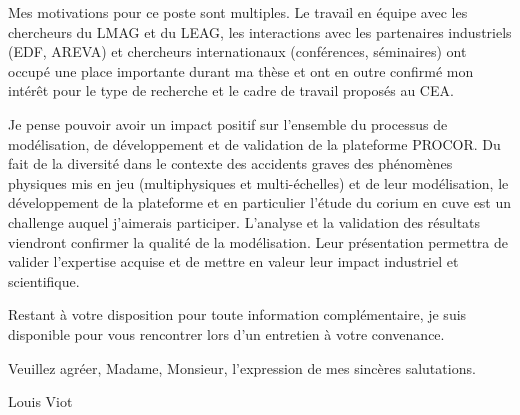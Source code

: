 \documentclass[11pt]{article}
\begin{document}
Mes motivations pour ce poste sont multiples. Le travail en équipe avec les chercheurs du LMAG et du LEAG, les interactions avec les partenaires industriels (EDF, AREVA) et chercheurs internationaux (conférences, séminaires) ont occupé une place importante durant ma thèse et ont en outre confirmé mon intérêt pour le type de recherche et le cadre de travail proposés au CEA.

Je pense pouvoir avoir un impact positif sur l'ensemble du processus de modélisation, de développement et de validation de la plateforme PROCOR. Du fait de la diversité dans le contexte des accidents graves des phénomènes physiques mis en jeu (multiphysiques et multi-échelles) et de leur modélisation, le développement de la plateforme et en particulier l'étude du corium en cuve est un challenge auquel j'aimerais participer. L'analyse et la validation des résultats viendront confirmer la qualité de la modélisation. Leur présentation permettra de valider l'expertise acquise et de mettre en valeur leur impact industriel et scientifique.

Restant à votre disposition pour toute information complémentaire, je suis disponible pour vous rencontrer lors d’un entretien à votre convenance.

Veuillez agréer, Madame, Monsieur, l’expression de mes sincères salutations.

\begin{flushright}
Louis Viot
\end{flushright}
\end{document}
